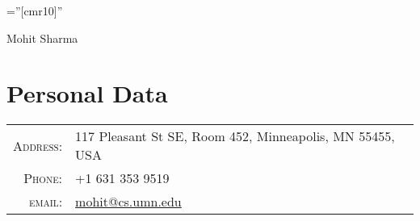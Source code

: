 \documentclass[a4paper,10pt]{article}
\begin{document}

\pagestyle{empty} %

\font\fb=''[cmr10]'' %

\par{\centering
		{\Huge Mohit Sharma
	}\bigskip\par}

\section{Personal Data}

\begin{tabular}{rl}
    \textsc{Address:}   & 117 Pleasant St SE, Room 452, Minneapolis, MN 55455, USA  \\
    \textsc{Phone:}     & +1 631 353 9519\\
    \textsc{email:}     & \href{mailto:mohit@cs.umn.edu}{mohit@cs.umn.edu}
\end{tabular}

\end{document}
